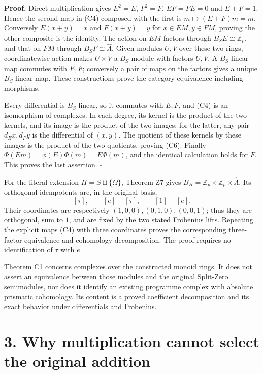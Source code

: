 \documentclass[
]{article}
\begin{document}
\textbf{Proof.} Direct multiplication gives \(E^2=E\), \(F^2=F\),
\(EF=FE=0\) and \(E+F=1\). Hence the second map in (C4) composed with
the first is \(m\mapsto(E+F)m=m\). Conversely \(E(x+y)=x\) and
\(F(x+y)=y\) for \(x\in EM,y\in FM\), proving the other composite is the
identity. The action on \(EM\) factors through \(B_SE\cong\mathbb Z_p\),
and that on \(FM\) through \(B_SF\cong\widehat\Lambda\). Given modules
\(U,V\) over these two rings, coordinatewise action makes \(U\times V\)
a \(B_S\)-module with factors \(U,V\). A \(B_S\)-linear map commutes
with \(E,F\); conversely a pair of maps on the factors gives a unique
\(B_S\)-linear map. These constructions prove the category equivalence
including morphisms.

Every differential is \(B_S\)-linear, so it commutes with \(E,F\), and
(C4) is an isomorphism of complexes. In each degree, its kernel is the
product of the two kernels, and its image is the product of the two
images: for the latter, any pair \(d_E x,d_F y\) is the differential of
\((x,y)\). The quotient of these kernels by these images is the product
of the two quotients, proving (C6). Finally
\(\Phi(Em)=\phi(E)\Phi(m)=E\Phi(m)\), and the identical calculation
holds for \(F\). This proves the last assertion. \(\square\)

For the literal extension \(H=S\sqcup\{\Omega\}\), Theorem Z7 gives
\(B_H=\mathbb Z_p\times\mathbb Z_p\times\widehat\Lambda\). Its
orthogonal idempotents are, in the original basis, \[
[\tau],\qquad [e]-[\tau],\qquad [1]-[e].
\tag{C7}
\] Their coordinates are respectively \((1,0,0),(0,1,0),(0,0,1)\); thus
they are orthogonal, sum to \(1\), and are fixed by the two stated
Frobenius lifts. Repeating the explicit maps (C4) with three coordinates
proves the corresponding three-factor equivalence and cohomology
decomposition. The proof requires no identification of \(\tau\) with
\(e\).

Theorem C1 concerns complexes over the constructed monoid rings. It does
not assert an equivalence between those modules and the original
Split-Zero semimodules, nor does it identify an existing programme
complex with absolute prismatic cohomology. Its content is a proved
coefficient decomposition and its exact behavior under differentials and
Frobenius.

\section{3. Why multiplication cannot select the original
addition}\label{why-multiplication-cannot-select-the-original-addition}
\end{document}
